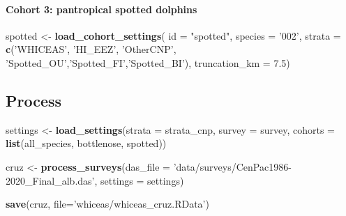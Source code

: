 \documentclass[
]{book}
\newenvironment{Shaded}{\begin{snugshade}}{\end{snugshade}}
\newcommand{\DataTypeTok}[1]{\textcolor[rgb]{0.13,0.29,0.53}{#1}}
\newcommand{\FloatTok}[1]{\textcolor[rgb]{0.00,0.00,0.81}{#1}}
\newcommand{\KeywordTok}[1]{\textcolor[rgb]{0.13,0.29,0.53}{\textbf{#1}}}
\newcommand{\NormalTok}[1]{#1}
\newcommand{\StringTok}[1]{\textcolor[rgb]{0.31,0.60,0.02}{#1}}
\begin{document}
\hypertarget{cohort-3-pantropical-spotted-dolphins}{%
\paragraph{Cohort 3: pantropical spotted dolphins}\label{cohort-3-pantropical-spotted-dolphins}}

\begin{Shaded}
\begin{Highlighting}[]
\NormalTok{spotted <-}\StringTok{ }\KeywordTok{load_cohort_settings}\NormalTok{(}
  \DataTypeTok{id =} \StringTok{"spotted"}\NormalTok{,}
  \DataTypeTok{species =} \StringTok{'002'}\NormalTok{,}
  \DataTypeTok{strata =} \KeywordTok{c}\NormalTok{(}\StringTok{'WHICEAS'}\NormalTok{, }\StringTok{'HI_EEZ'}\NormalTok{, }\StringTok{'OtherCNP'}\NormalTok{,}
             \StringTok{'Spotted_OU'}\NormalTok{,}\StringTok{'Spotted_FI'}\NormalTok{,}\StringTok{'Spotted_BI'}\NormalTok{),}
  \DataTypeTok{truncation_km =} \FloatTok{7.5}\NormalTok{)}
\end{Highlighting}
\end{Shaded}

\hypertarget{process}{%
\subsection*{Process}\label{process}}

\begin{Shaded}
\begin{Highlighting}[]
\NormalTok{settings <-}\StringTok{ }\KeywordTok{load_settings}\NormalTok{(}\DataTypeTok{strata =}\NormalTok{ strata_cnp,}
                          \DataTypeTok{survey =}\NormalTok{ survey,}
                          \DataTypeTok{cohorts =} \KeywordTok{list}\NormalTok{(all_species,}
\NormalTok{                                         bottlenose,}
\NormalTok{                                         spotted))}

\NormalTok{cruz <-}\StringTok{ }
\StringTok{  }\KeywordTok{process_surveys}\NormalTok{(}\DataTypeTok{das_file =} \StringTok{'data/surveys/CenPac1986-2020_Final_alb.das'}\NormalTok{,}
                  \DataTypeTok{settings =}\NormalTok{ settings) }

\KeywordTok{save}\NormalTok{(cruz, }\DataTypeTok{file=}\StringTok{'whiceas/whiceas_cruz.RData'}\NormalTok{)}
\end{Highlighting}
\end{Shaded}
\end{document}
